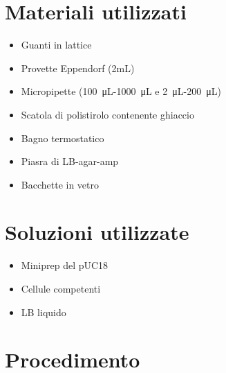 \section{Materiali utilizzati}

\begin{itemize}
	\item Guanti in lattice
	\item Provette Eppendorf (2mL)
	\item Micropipette (\SI{100}{\micro\liter}-\SI{1000}{\micro\liter} e \SI{2}{\micro\liter}-\SI{200}{\micro\liter})
	\item Scatola di polistirolo contenente ghiaccio
	\item Bagno termostatico
	\item Piasra di LB-agar-amp
	\item Bacchette in vetro
\end{itemize}

\section{Soluzioni utilizzate}

\begin{itemize}
	\item Miniprep del pUC18
	\item Cellule competenti
	\item LB liquido
\end{itemize}

\section{Procedimento}

